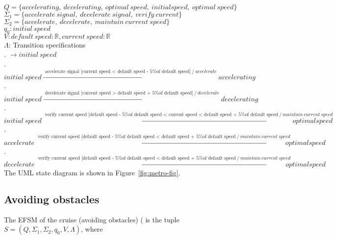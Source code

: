 \documentclass[12pt]{article}
\begin{document}
\begin{spacing}{1.5}
\noindent $Q = \{accelerating,~decelerating,~optimal~speed,~initial speed,~optimal~speed\}$\\
\noindent $\Sigma_1 = \{accelerate~signal,~decelerate~signal,~ verify~current\}$\\
\noindent $\Sigma_2 = \{accelerate,~decelerate,~maintain~current~speed\}$\\
\noindent $q_0: initial~speed$\\
\noindent $V: default~speed: \mathbb R, current~speed: \mathbb R$\\
\noindent $\Lambda$: Transition specifications\\
. $\rightarrow initial~speed$\\
. $initial~speed \xrightarrow {\text { accelerate signal [current speed < default speed - 5\% of default speed]}~/ ~accelerate} accelerating$\\
. $initial~speed \xrightarrow {\text { decelerate signal [current speed > default speed + 5\% of default speed]}~/ ~decelerate} decelerating$\\
. $initial~speed \xrightarrow {\text { verify current speed [default speed - 5\% of default speed < current speed < default speed + 5\% of default speed}~/~maintain~current~speed} optimal speed$\\
. $accelerate \xrightarrow {\text { verify current speed [default speed - 5\% of default speed < default speed + 5\% of default speed}~/~maintain~current~speed} optimal speed$\\
. $decelerate \xrightarrow {\text { verify current speed [default speed - 5\% of default speed < default speed + 5\% of default speed}~/~maintain~current~speed} optimal speed$\\


\noindent The UML state diagram is shown in Figure~\ref{fig:metro-fig}.
\newpage

\subsection{Avoiding obstacles}

\noindent The EFSM of the cruise (avoiding obstacles) ( is the tuple $S = (Q, \Sigma_1, \Sigma_2, q_0, V, \Lambda)$, where\\


\end{spacing}
\end{document}
